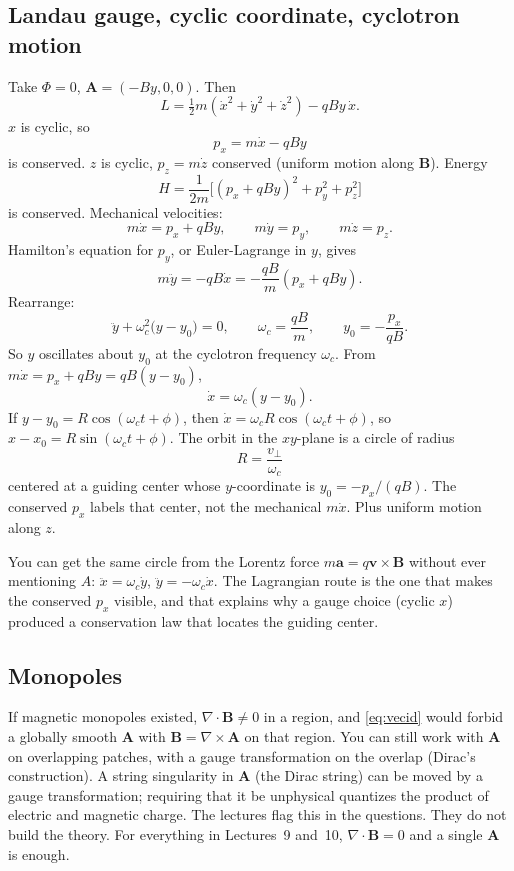 \documentclass[11pt]{article}
\numberwithin{equation}{section}
\newcommand{\vect}[1]{\mathbf{#1}}
\begin{document}
\subsection{Landau gauge, cyclic coordinate, cyclotron motion}

Take $\Phi=0$, $\vect{A}=(-By,0,0)$. Then
\[
L = \tfrac12 m(\dot x^2+\dot y^2+\dot z^2) - q B y\,\dot x.
\]
$x$ is cyclic, so
\[
p_x = m\dot x - q B y
\]
is conserved. $z$ is cyclic, $p_z=m\dot z$ conserved (uniform motion along $\vect{B}$). Energy
\[
H = \frac{1}{2m}\bigl[(p_x + q B y)^2 + p_y^2 + p_z^2\bigr]
\]
is conserved. Mechanical velocities:
\[
m\dot x = p_x + q B y,\qquad m\dot y = p_y,\qquad m\dot z = p_z.
\]
Hamilton's equation for $p_y$, or Euler-Lagrange in $y$, gives
\[
m\ddot y = -q B\dot x = -\frac{q B}{m}(p_x + q B y).
\]
Rearrange:
\[
\ddot y + \omega_c^2 \bigl(y - y_0\bigr) = 0,
\qquad
\omega_c = \frac{q B}{m},\qquad
y_0 = -\frac{p_x}{q B}.
\]
So $y$ oscillates about $y_0$ at the cyclotron frequency $\omega_c$. From $m\dot x=p_x+qBy=qB(y-y_0)$,
\[
\dot x=\omega_c(y-y_0).
\]
If $y-y_0=R\cos(\omega_c t+\phi)$, then $\dot x=\omega_c R\cos(\omega_c t+\phi)$, so $x-x_0=R\sin(\omega_c t+\phi)$. The orbit in the $xy$-plane is a circle of radius
\[
R = \frac{v_\perp}{\omega_c}
\]
centered at a guiding center whose $y$-coordinate is $y_0=-p_x/(qB)$. The conserved $p_x$ labels that center, not the mechanical $m\dot x$. Plus uniform motion along $z$.

You can get the same circle from the Lorentz force $m\vect{a}=q\vect{v}\times\vect{B}$ without ever mentioning $A$: $\ddot x=\omega_c\dot y$, $\ddot y=-\omega_c\dot x$. The Lagrangian route is the one that makes the conserved $p_x$ visible, and that explains why a gauge choice (cyclic $x$) produced a conservation law that locates the guiding center.

\subsection{Monopoles}

If magnetic monopoles existed, $\nabla\cdot\vect{B}\neq 0$ in a region, and \eqref{eq:vecid} would forbid a globally smooth $\vect{A}$ with $\vect{B}=\nabla\times\vect{A}$ on that region. You can still work with $\vect{A}$ on overlapping patches, with a gauge transformation on the overlap (Dirac's construction). A string singularity in $\vect{A}$ (the Dirac string) can be moved by a gauge transformation; requiring that it be unphysical quantizes the product of electric and magnetic charge. The lectures flag this in the questions. They do not build the theory. For everything in Lectures~9 and~10, $\nabla\cdot\vect{B}=0$ and a single $\vect{A}$ is enough.
\end{document}
